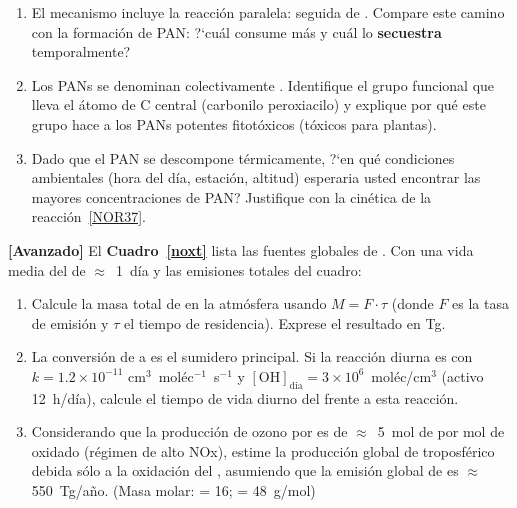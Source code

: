 \begin{bloque_ejercicios}
\begin{ejercicios}
\begin{enumerate}[label=\alph*)]
    \item El mecanismo incluye la reacci\'on paralela:
          seguida de
          .
          Compare este camino con la formaci\'on de PAN:
          ?`cu\'al consume m\'as  y cu\'al lo
          \textbf{secuestra} temporalmente?

    \item Los PANs se denominan colectivamente
          . Identifique el grupo funcional
          que lleva el \'atomo de C central (carbonilo peroxiacilo)
          y explique por qu\'e este grupo hace a los PANs
          potentes fitot\'oxicos (t\'oxicos para plantas).

    \item Dado que el PAN se descompone t\'ermicamente,
          ?`en qu\'e condiciones ambientales (hora del d\'ia,
          estaci\'on, altitud) esperaria usted encontrar
          las mayores concentraciones de PAN? Justifique
          con la cin\'etica de la reacci\'on~\ref{NOR37}.
\end{enumerate}

\item \textbf{[Avanzado]} El \textbf{Cuadro~\ref{noxt}} lista
las fuentes globales de . Con una vida media del
 de $\approx$~1~d\'ia y las emisiones totales
del cuadro:

\begin{enumerate}[label=\alph*)]
    \item Calcule la masa total de  en la atm\'osfera
          usando $M = F\cdot\tau$ (donde $F$ es la tasa de
          emisi\'on y $\tau$ el tiempo de residencia).
          Exprese el resultado en \si{\tera\gram}.

    \item La conversi\'on de  a  es el
          sumidero principal. Si la reacci\'on diurna es
           con $k = 1.2\times10^{-11}$
          cm$^3$~mol\'ec$^{-1}$~s$^{-1}$ y
          $[\mathrm{OH}]_{\text{dia}} = 3\times10^6$~mol\'ec/cm$^3$
          (activo 12~h/d\'ia), calcule el tiempo de vida
          diurno del  frente a esta reacci\'on.

    \item Considerando que la producci\'on de ozono por
           es de $\approx$~5~mol de  por
          mol de  oxidado (r\'egimen de alto NOx),
          estime la producci\'on global de  troposf\'erico
          debida s\'olo a la oxidaci\'on del ,
          asumiendo que la emisi\'on global de  es
          $\approx$ 550~Tg/a\~no.
          (Masa molar:  = 16;  = 48~g/mol)


\end{enumerate}
\end{ejercicios}
\end{bloque_ejercicios}
